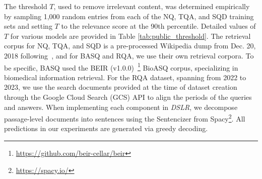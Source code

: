 The threshold \( T \), used to remove irrelevant content, was determined empirically by sampling 1,000 random entries from each of the NQ, TQA, and SQD training sets and setting \( T \) to the relevance score at the 90th percentile. Detailed values of \( T \) for various models are provided in Table \ref{tab:public_threshold}.
The retrieval corpus for NQ, TQA, and SQD is a pre-processed Wikipedia dump from Dec. 20, 2018 following~\citet{DPR-karpukhin}, and for BASQ and RQA, we use their own retrieval corpora.
To be specific, BASQ used the BEIR (v1.0.0)~\footnote{\url{https://github.com/beir-cellar/beir}} BioASQ corpus, specializing in biomedical information retrieval.
For the RQA dataset, spanning from 2022 to 2023, we use the search documents provided at the time of dataset creation through the Google Cloud Search (GCS) API to align the periods of the queries and answers. 
When implementing each component in \textit{DSLR}, we decompose passage-level documents into sentences using the Sentencizer from Spacy\footnote{\url{https://spacy.io/}}. All predictions in our experiments are generated via greedy decoding. 

